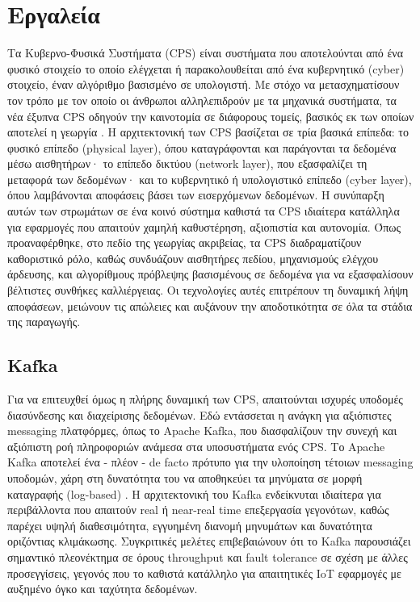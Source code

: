 \chapter{Εργαλεία}

Τα Κυβερνο-Φυσικά Συστήματα (CPS) είναι συστήματα που αποτελούνται από ένα
φυσικό στοιχείο το οποίο ελέγχεται ή παρακολουθείται από ένα κυβερνητικό
(cyber) στοιχείο, έναν αλγόριθμο βασισμένο σε υπολογιστή. Με στόχο να
μετασχηματίσουν τον τρόπο με τον οποίο οι άνθρωποι αλληλεπιδρούν με τα μηχανικά
συστήματα, τα νέα έξυπνα CPS οδηγούν την καινοτομία σε διάφορους τομείς,
βασικός εκ των οποίων αποτελεί η γεωργία \cite{cps}. Η αρχιτεκτονική των CPS
βασίζεται σε τρία βασικά επίπεδα: το φυσικό επίπεδο (physical layer), όπου
καταγράφονται και παράγονται τα δεδομένα μέσω αισθητήρων· το επίπεδο δικτύου
(network layer), που εξασφαλίζει τη μεταφορά των δεδομένων· και το κυβερνητικό
ή υπολογιστικό επίπεδο (cyber layer), όπου λαμβάνονται αποφάσεις βάσει των
εισερχόμενων δεδομένων. Η συνύπαρξη αυτών των στρωμάτων σε ένα κοινό σύστημα
καθιστά τα CPS ιδιαίτερα κατάλληλα για εφαρμογές που απαιτούν χαμηλή
καθυστέρηση, αξιοπιστία και αυτονομία. Όπως προαναφέρθηκε, στο πεδίο της
γεωργίας ακριβείας, τα CPS διαδραματίζουν καθοριστικό ρόλο, καθώς συνδυάζουν
αισθητήρες πεδίου, μηχανισμούς ελέγχου άρδευσης, και αλγορίθμους πρόβλεψης
βασισμένους σε δεδομένα για να εξασφαλίσουν βέλτιστες συνθήκες καλλιέργειας. Οι
τεχνολογίες αυτές επιτρέπουν τη δυναμική λήψη αποφάσεων, μειώνουν τις απώλειες
και αυξάνουν την αποδοτικότητα σε όλα τα στάδια της παραγωγής.

\section{Kafka}

Για να επιτευχθεί όμως η πλήρης δυναμική των CPS, απαιτούνται ισχυρές υποδομές
διασύνδεσης και διαχείρισης δεδομένων. Εδώ εντάσσεται η ανάγκη για αξιόπιστες
messaging πλατφόρμες, όπως το Apache Kafka, που διασφαλίζουν την συνεχή και
αξιόπιστη ροή πληροφοριών ανάμεσα στα υποσυστήματα ενός CPS. Το Apache Kafka
αποτελεί ένα - πλέον - de facto πρότυπο για την υλοποίηση τέτοιων messaging
υποδομών, χάρη στη δυνατότητα του να αποθηκεύει τα μηνύματα σε μορφή καταγραφής
(log-based) \cite{kafkabdd}. Η αρχιτεκτονική του Kafka ενδείκνυται ιδιαίτερα
για περιβάλλοντα που απαιτούν real ή near-real time επεξεργασία γεγονότων,
καθώς παρέχει υψηλή διαθεσιμότητα, εγγυημένη διανομή μηνυμάτων και δυνατότητα
οριζόντιας κλιμάκωσης. Συγκριτικές μελέτες \cite{rtkafka} επιβεβαιώνουν ότι το
Kafka παρουσιάζει σημαντικό πλεονέκτημα σε όρους throughput και fault tolerance
σε σχέση με άλλες προσεγγίσεις, γεγονός που το καθιστά κατάλληλο για
απαιτητικές IoT εφαρμογές με αυξημένο όγκο και ταχύτητα δεδομένων.

